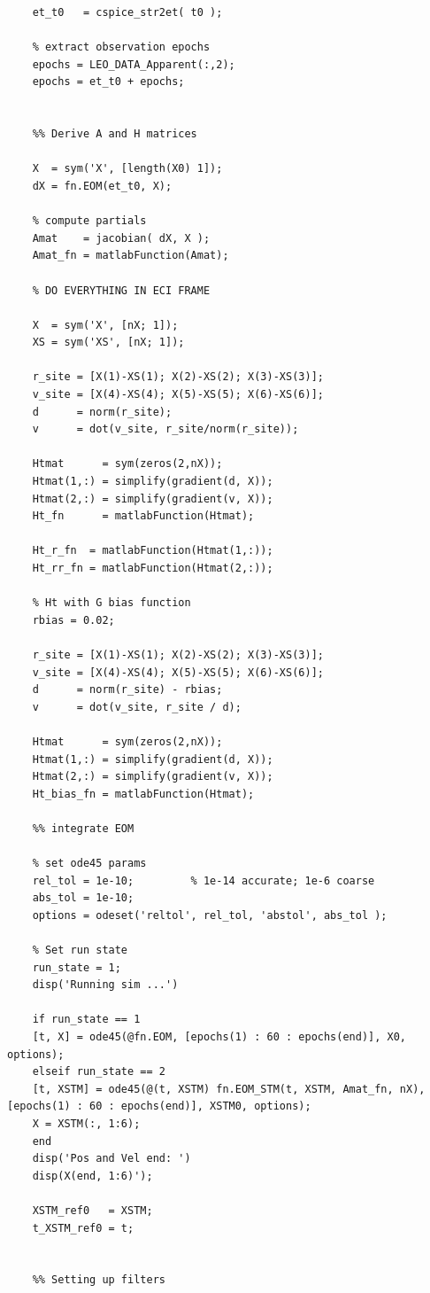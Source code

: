 \documentclass[conf]{new-aiaa}
\begin{document}
\begin{lstlisting}[basicstyle=\footnotesize]
	%  Convert the epoch to ephemeris time. 
	et_t0   = cspice_str2et( t0 );
	
	% extract observation epochs 
	epochs = LEO_DATA_Apparent(:,2); 
	epochs = et_t0 + epochs; 
	
	
	%% Derive A and H matrices 
	
	X  = sym('X', [length(X0) 1]); 
	dX = fn.EOM(et_t0, X); 
	
	% compute partials 
	Amat    = jacobian( dX, X );       
	Amat_fn = matlabFunction(Amat); 
	
	% DO EVERYTHING IN ECI FRAME 
	
	X  = sym('X', [nX; 1]); 
	XS = sym('XS', [nX; 1]); 
	
	r_site = [X(1)-XS(1); X(2)-XS(2); X(3)-XS(3)]; 
	v_site = [X(4)-XS(4); X(5)-XS(5); X(6)-XS(6)]; 
	d      = norm(r_site); 
	v      = dot(v_site, r_site/norm(r_site)); 
	
	Htmat      = sym(zeros(2,nX)); 
	Htmat(1,:) = simplify(gradient(d, X)); 
	Htmat(2,:) = simplify(gradient(v, X)); 
	Ht_fn      = matlabFunction(Htmat); 
	
	Ht_r_fn  = matlabFunction(Htmat(1,:)); 
	Ht_rr_fn = matlabFunction(Htmat(2,:)); 
	
	% Ht with G bias function 
	rbias = 0.02; 
	
	r_site = [X(1)-XS(1); X(2)-XS(2); X(3)-XS(3)]; 
	v_site = [X(4)-XS(4); X(5)-XS(5); X(6)-XS(6)]; 
	d      = norm(r_site) - rbias; 
	v      = dot(v_site, r_site / d); 
	
	Htmat      = sym(zeros(2,nX)); 
	Htmat(1,:) = simplify(gradient(d, X)); 
	Htmat(2,:) = simplify(gradient(v, X)); 
	Ht_bias_fn = matlabFunction(Htmat); 
	
	%% integrate EOM 
	
	% set ode45 params 
	rel_tol = 1e-10;         % 1e-14 accurate; 1e-6 coarse 
	abs_tol = 1e-10; 
	options = odeset('reltol', rel_tol, 'abstol', abs_tol ); 
	
	% Set run state 
	run_state = 1; 
	disp('Running sim ...') 
	
	if run_state == 1
	[t, X] = ode45(@fn.EOM, [epochs(1) : 60 : epochs(end)], X0, options); 
	elseif run_state == 2
	[t, XSTM] = ode45(@(t, XSTM) fn.EOM_STM(t, XSTM, Amat_fn, nX), [epochs(1) : 60 : epochs(end)], XSTM0, options); 
	X = XSTM(:, 1:6); 
	end 
	disp('Pos and Vel end: ')
	disp(X(end, 1:6)'); 
	
	XSTM_ref0   = XSTM; 
	t_XSTM_ref0 = t; 
	
	
	%% Setting up filters 
	

\end{lstlisting}
\end{document}
